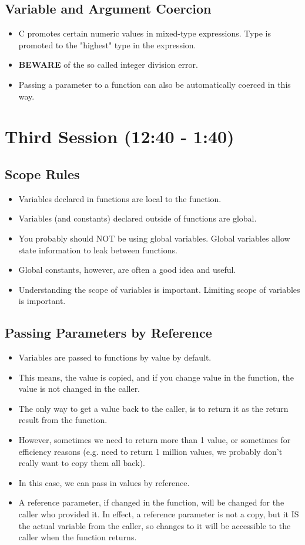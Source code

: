 \documentclass[11pt]{article}
\begin{document}
\subsection{Variable and Argument Coercion}
\label{sec-2-2}

\begin{itemize}
\item C promotes certain numeric values in mixed-type expressions.  Type
is promoted to the "highest" type in the expression.
\item \textbf{BEWARE} of the so called integer division error.
\item Passing a parameter to a function can also be automatically coerced in this way.
\end{itemize}
\section{Third Session (12:40 - 1:40)}
\label{sec-3}

\subsection{Scope Rules}
\label{sec-3-1}
\begin{itemize}
\item Variables declared in functions are local to the function.
\item Variables (and constants) declared outside of functions are global.
\item You probably should NOT be using global variables.  Global variables allow
state information to leak between functions.
\item Global constants, however, are often a good idea and useful.
\item Understanding the scope of variables is important.  Limiting scope of
variables is important.
\end{itemize}
\subsection{Passing Parameters by Reference}
\label{sec-3-2}
\begin{itemize}
\item Variables are passed to functions by value by default.
\item This means, the value is copied, and if you change value in the
function, the value is not changed in the caller.
\item The only way to get a value back to the caller, is to return it
as the return result from the function.
\item However, sometimes we need to return more than 1 value, or sometimes
for efficiency reasons (e.g. need to return 1 million values, we probably
don't really want to copy them all back).
\item In this case, we can pass in values by reference.
\item A reference parameter, if changed in the function, will be changed
for the caller who provided it.  In effect, a reference parameter is
not a copy, but it IS the actual variable from the caller, so
changes to it will be accessible to the caller when the function
returns.
\end{itemize}
\end{document}
